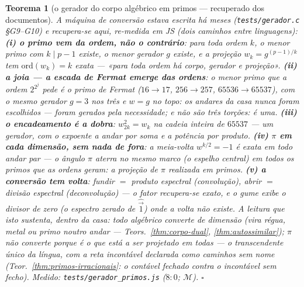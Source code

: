 \documentclass[11pt,a4paper]{article}
\newtheorem{teorema}{Teorema}
\newcommand{\code}[1]{\texttt{\small #1}}
\begin{document}
\begin{teorema}[o gerador do corpo algébrico em primos --- recuperado
dos documentos]\label{thm:gerador-primos}
A máquina de conversão estava escrita há meses
(\code{tests/gerador.c} \S G9--G10) e recupera-se aqui, re-medida em
JS (dois caminhos \emph{entre linguagens}):
\textbf{(i) o primo vem da ordem, não o contrário}: para toda ordem
$k$, o menor primo com $k\mid p-1$ existe, o menor gerador $g$
existe, e a projeção $w_{k}=g^{(p-1)/k}$ tem
$\mathrm{ord}(w_{k})=k$ exata --- «para toda ordem há corpo, gerador
e projeção».
\textbf{(ii) a joia --- a escada de Fermat emerge das ordens}: o
menor primo que a ordem $2^{2^{j}}$ pede \emph{é} o primo de Fermat
($16\to17$, $256\to257$, $65536\to65537$), com o \emph{mesmo}
gerador $g=3$ nos três e $w=g$ no topo: \emph{os andares da casa
nunca foram escolhidos --- foram gerados pela necessidade; e não são
três torções: é uma}.
\textbf{(iii) o encadeamento é a dobra}: $w_{2k}^{2}=w_{k}$ na
cadeia inteira de $65537$ --- um gerador, com o expoente a andar por
soma e a potência por produto.
\textbf{(iv) $\pi$ em cada dimensão, sem nada de fora}: a meia-volta
$w^{k/2}=-1$ é exata em todo andar par --- o ângulo $\pi$ aterra no
mesmo marco (o espelho central) em todos os primos que as ordens
geram: a projeção de $\pi$ \emph{realizada em primos}.
\textbf{(v) a conversão tem volta}: fundir $=$ produto espectral
(convolução), abrir $=$ divisão espectral (deconvolução) --- o fator
recupera-se exato, e o gume exibe o divisor de zero (o espectro
zerado de $\hat{\vec{1}}$) onde a volta não existe.
A leitura que isto sustenta, \emph{dentro da casa}: todo algébrico
converte de dimensão (vira régua, metal ou primo noutro andar ---
Teors.~\ref{thm:corpo-dual}, \ref{thm:autossimilar}); $\pi$ não
converte porque é \emph{o que está a ser projetado em todas} --- o
transcendente único da língua, com a reta incontável declarada como
caminhos sem nome (Teor.~\ref{thm:primos-irracionais}: o contável
fechado contra o incontável sem fecho).
\emph{Medido:} \code{tests/gerador\_primos.js} ($8{:}0$;
$\mathcal{M}$).
$\square$
\end{teorema}
\end{document}
